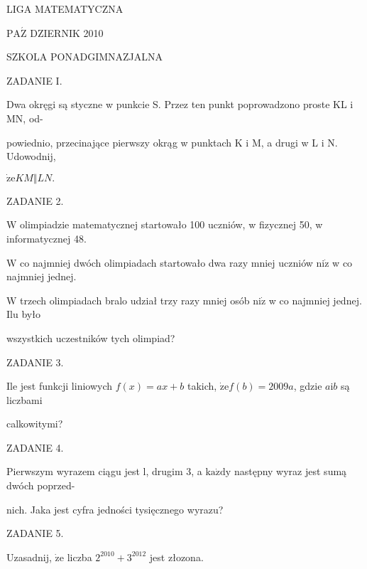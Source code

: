\documentclass[a4paper,12pt]{article}
\begin{document}
LIGA MATEMATYCZNA

$\mathrm{P}\mathrm{A}\acute{\mathrm{Z}}$ DZIERNIK 2010

SZKOLA PONADGIMNAZJALNA

ZADANIE I.

Dwa okręgi są styczne w punkcie S. Przez ten punkt poprowadzono proste KL i MN, od-

powiednio, przecinające pierwszy okrąg w punktach K i M, a drugi w L i N. Udowodnij,

$\dot{\mathrm{z}}\mathrm{e}KM\Vert LN.$

ZADANIE 2.

$\mathrm{W}$ olimpiadzie matematycznej startowało 100 uczniów, w fizycznej 50, w informatycznej 48.

$\mathrm{W}$ co najmniej dwóch olimpiadach startowało dwa razy mniej uczniów $\mathrm{n}\mathrm{i}\dot{\mathrm{z}}$ w co najmniej jednej.

$\mathrm{W}$ trzech olimpiadach bralo udział trzy razy mniej osób $\mathrm{n}\mathrm{i}\dot{\mathrm{z}}$ w co najmniej jednej. Ilu było

wszystkich uczestników tych olimpiad?

ZADANIE 3.

Ile jest funkcji liniowych $f(x) = ax+b$ takich, $\dot{\mathrm{z}}\mathrm{e} f(b) = 2009a$, gdzie $a \mathrm{i} b$ są liczbami

calkowitymi?

ZADANIE 4.

Pierwszym wyrazem ciągu jest l, drugim 3, a $\mathrm{k}\mathrm{a}\dot{\mathrm{z}}\mathrm{d}\mathrm{y}$ następny wyraz jest sumą dwóch poprzed-

nich. Jaka jest cyfra jedności tysięcznego wyrazu?

ZADANIE 5.

Uzasadnij, $\dot{\mathrm{z}}\mathrm{e}$ liczba $2^{2010}+3^{2012}$ jest złozona.
\end{document}
